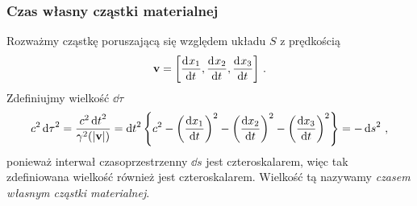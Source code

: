 \documentclass[../main.tex]{subfiles}
\begin{document}
\subsubsection{Czas własny cząstki materialnej}
Rozważmy cząstkę poruszającą się względem układu \(S\) z prędkością
\begin{equation*}
    \mathbf{v}=\left[\dv[]{x_1}{t},\dv[]{x_2}{t},\dv[]{x_3}{t}\right]\,.
\end{equation*}
Zdefiniujmy wielkość \(\dd{\tau}\)
\begin{equation*}
    c^2\dd{\tau}^2=\frac{c^2\dd{t}^2}{\gamma^2(|\mathbf{v}|)}=\dd{t}^2\left\{c^2-\left(\dv{x_1}{t}\right)^2-\left(\dv{x_2}{t}\right)^2-\left(\dv{x_3}{t}\right)^2\right\}=-\dd{s}^2\,,
\end{equation*}
ponieważ interwał czasoprzestrzenny \(\dd{s}\) jest czteroskalarem, więc tak zdefiniowana wielkość również jest czteroskalarem. Wielkość tą nazywamy \textit{czasem własnym cząstki materialnej}.\\
\end{document}
